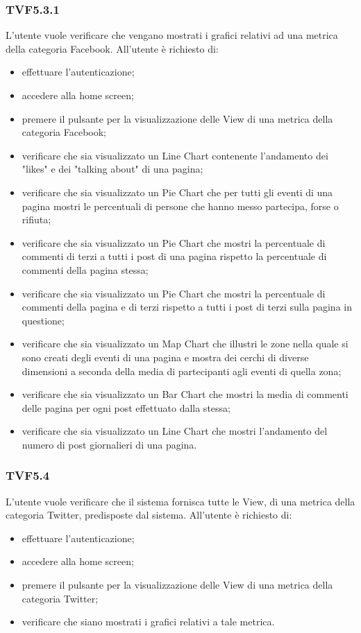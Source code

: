 		\subsubsection{TVF5.3.1}
			L'utente vuole verificare che vengano mostrati i grafici relativi ad una metrica della categoria Facebook. All'utente è richiesto di:
			\begin{itemize}
				\item effettuare l'autenticazione;
				\item accedere alla home screen;
				\item premere il pulsante per la visualizzazione delle View di una metrica della categoria Facebook;
				\item verificare che sia visualizzato un Line Chart contenente l'andamento dei "likes" e dei "talking about" di una pagina;
				\item verificare che sia visualizzato un Pie Chart che per tutti gli eventi di una pagina mostri le percentuali di persone che hanno messo partecipa, forse o rifiuta;
				\item verificare che sia visualizzato un Pie Chart che mostri la percentuale di commenti di terzi a tutti i post di una pagina rispetto la percentuale di commenti della pagina stessa;
				\item verificare che sia visualizzato un Pie Chart che mostri la percentuale di commenti della pagina e di terzi rispetto a tutti i post di terzi sulla pagina in questione;
				\item verificare che sia visualizzato un Map Chart che illustri le zone nella quale si sono creati degli eventi di una pagina e mostra dei cerchi di diverse dimensioni a seconda della media di partecipanti agli eventi di quella zona;
				\item verificare che sia visualizzato un Bar Chart che mostri la media di commenti delle pagina per ogni post effettuato dalla stessa;
				\item verificare che sia visualizzato un Line Chart che mostri l'andamento del numero di post giornalieri di una pagina.
			\end{itemize}
			
		\subsubsection{TVF5.4}
			L'utente vuole verificare che il sistema fornisca tutte le View, di una metrica della categoria Twitter, predisposte dal sistema. All'utente è richiesto di:
			\begin{itemize}
				\item effettuare l'autenticazione;
				\item accedere alla home screen;
				\item premere il pulsante per la visualizzazione delle View di una metrica della categoria Twitter;
				\item verificare che siano mostrati i grafici relativi a tale metrica.
			\end{itemize}
			
